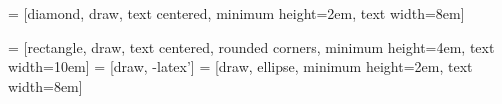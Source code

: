  = [diamond, draw, text centered, minimum height=2em, text width=8em]


 = [rectangle, draw, text centered, rounded corners, minimum height=4em, text width=10em]
 = [draw, -latex']
 = [draw, ellipse, minimum height=2em, text width=8em]




